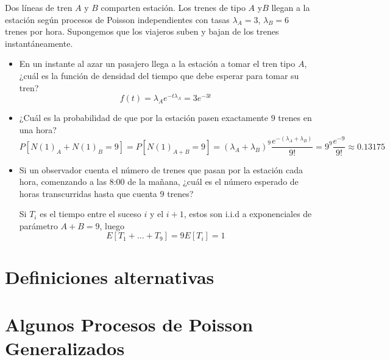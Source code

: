 \documentclass[PREyA.tex]{subfiles}
\begin{document}
\begin{example}
Dos líneas de tren $A$ y $B$ comparten estación. Los trenes de tipo $A$ y$B$ llegan a la estación según procesos de Poisson independientes con tasas $\lambda_A =3$, $\lambda_B =6$ trenes por hora. Supongemos que los viajeros suben y bajan de los trenes instantáneamente.
\begin{itemize}
\item En un instante al azar un pasajero llega a la estación a tomar el tren tipo $A$, ¿cuál es la función de densidad del tiempo que debe esperar para tomar su tren?
$$
f(t) = \lambda_A e^{-t\lambda_A} = 3e^{-3t}
$$
\item ¿Cuál es la probabilidad de que por la estación pasen exactamente $9$ trenes en una hora?
$$
P[N(1)_A + N(1)_B = 9] = P[N(1)_{A+B} = 9] = (\lambda_A + \lambda_B)^9\frac{e^{-(\lambda_A+\lambda_B)}}{9!} = 9^9\frac{e^{-9}}{9!} \approx 0.13175
$$
\item Si un observador cuenta el número de trenes que pasan por la estación cada hora, comenzando a las 8:00 de la mañana, ¿cuál es el número esperado de horas transcurridas hasta que cuenta $9$ trenes?

Si $T_i$ es el tiempo entre el suceso $i$ y el $i+1$, estos son i.i.d a exponenciales de parámetro $A+B=9$, luego
$$
E[T_1 + \dotsc + T_9] = 9 E[T_i] = 1
$$
\end{itemize}
\end{example}
\section{Definiciones alternativas}
\section{Algunos Procesos de Poisson Generalizados}
\end{document}
